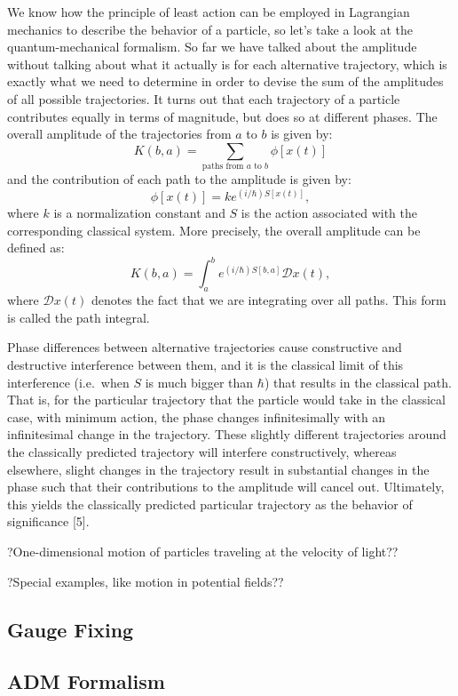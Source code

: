 \documentclass[12pt]{revtex4}
\begin{document}
We know how the principle of least action can be employed in Lagrangian mechanics to describe the behavior of a particle, so let's take a look at the quantum-mechanical formalism. So far we have talked about the amplitude without talking about what it actually is for each alternative trajectory, which is exactly what we need to determine in order to devise the sum of the amplitudes of all possible trajectories. It turns out that each trajectory of a particle contributes equally in terms of magnitude, but does so at different phases. The overall amplitude of the trajectories from $a$ to $b$ is given by:
\[ K(b,a) = \sum_{\text{paths from $a$ to $b$}} \phi [x(t)] \]
and the contribution of each path to the amplitude is given by:
\[ \phi [x(t)] = k e^{(i/\hbar)S[x(t)]}, \]
where $k$ is a normalization constant and $S$ is the action associated with the corresponding classical system. More precisely, the overall amplitude can be defined as:
\[ K(b,a) = \int_{a}^{b} e^{(i/\hbar)S[b, a]} \mathcal{D}x(t), \]
where $\mathcal{D}x(t)$ denotes the fact that we are integrating over all paths. This form is called the path integral.

Phase differences between alternative trajectories cause constructive and destructive interference between them, and it is the classical limit of this interference (i.e.~when $S$ is much bigger than $\hbar$) that results in the classical path. That is, for the particular trajectory that the particle would take in the classical case, with minimum action, the phase changes infinitesimally with an infinitesimal change in the trajectory. These slightly different trajectories around the classically predicted trajectory will interfere constructively, whereas elsewhere, slight changes in the trajectory result in substantial changes in the phase such that their contributions to the amplitude will cancel out. Ultimately, this yields the classically predicted particular trajectory as the behavior of significance [5].

?One-dimensional motion of particles traveling at the velocity of light??

?Special examples, like motion in potential fields??

\subsection{Gauge Fixing} \label{gauge}

\subsection{ADM Formalism} \label{ADM}
\end{document}
